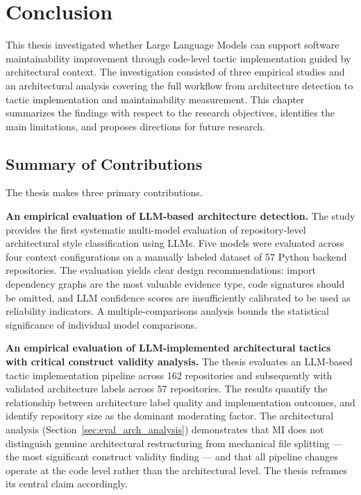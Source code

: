 \chapter{Conclusion}
\label{chap:conclusion}

This thesis investigated whether Large Language Models can support software maintainability improvement through code-level tactic implementation guided by architectural context. The investigation consisted of three empirical studies and an architectural analysis covering the full workflow from architecture detection to tactic implementation and maintainability measurement. This chapter summarizes the findings with respect to the research objectives, identifies the main limitations, and proposes directions for future research.

\section{Summary of Contributions}

The thesis makes three primary contributions.

\textbf{An empirical evaluation of LLM-based architecture detection.} The study provides the first systematic multi-model evaluation of repository-level architectural style classification using LLMs. Five models were evaluated across four context configurations on a manually labeled dataset of 57 Python backend repositories. The evaluation yields clear design recommendations: import dependency graphs are the most valuable evidence type, code signatures should be omitted, and LLM confidence scores are insufficiently calibrated to be used as reliability indicators. A multiple-comparisons analysis bounds the statistical significance of individual model comparisons.

\textbf{An empirical evaluation of LLM-implemented architectural tactics with critical construct validity analysis.} The thesis evaluates an LLM-based tactic implementation pipeline across 162 repositories and subsequently with validated architecture labels across 57 repositories. The results quantify the relationship between architecture label quality and implementation outcomes, and identify repository size as the dominant moderating factor. The architectural analysis (Section~\ref{sec:eval_arch_analysis}) demonstrates that MI does not distinguish genuine architectural restructuring from mechanical file splitting — the most significant construct validity finding — and that all pipeline changes operate at the code level rather than the architectural level. The thesis reframes its central claim accordingly.

